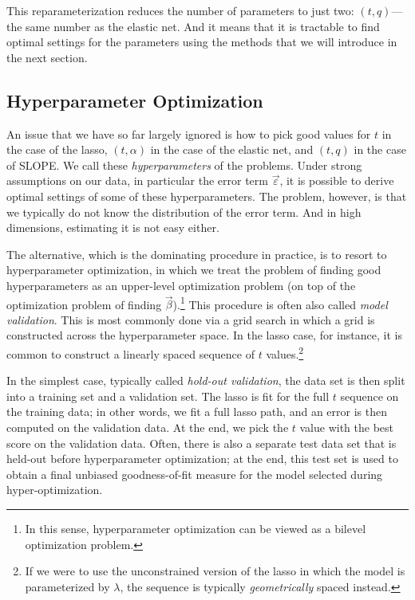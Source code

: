 This reparameterization reduces the number of parameters to just two: \((t,q)\)---the same number as the elastic net. And it means that it is tractable to find optimal settings for the parameters using the methods that we will introduce in the next section.

\subsection{Hyperparameter Optimization}

An issue that we have so far largely ignored is how to pick good values for \(t\) in the case of the lasso, \((t,\alpha)\) in the case of the elastic net, and \((t, q)\) in the case of SLOPE. We call these \emph{hyperparameters} of the problems. Under strong assumptions on our data, in particular the error term \(\vec{\varepsilon}\), it is possible to derive optimal settings of some of these hyperparameters. The problem, however, is that we typically do not know the distribution of the error term. And in high dimensions, estimating it is not easy either.

The alternative, which is the dominating procedure in practice, is to resort to hyperparameter optimization, in which we treat the problem of finding good hyperparameters as an upper-level optimization problem (on top of the optimization problem of finding \(\vec{\beta}\)).\footnote{In this sense, hyperparameter optimization can be viewed as a bilevel optimization problem.} This procedure is often also called \emph{model validation}. This is most commonly done via a grid search in which a grid is constructed across the hyperparameter space. In the lasso case, for instance, it is common to construct a linearly spaced sequence of \(t\) values.\footnote{If we were to use the unconstrained version of the lasso in which the model is parameterized by \(\lambda\), the sequence is typically \emph{geometrically} spaced instead.}

In the simplest case, typically called \emph{hold-out validation}, the data set is then split into a training set and a validation set. The lasso is fit for the full \(t\) sequence on the training data; in other words, we fit a full lasso path, and an error is then computed on the validation data. At the end, we pick the \(t\) value with the best score on the validation data. Often, there is also a separate test data set that is held-out before hyperparameter optimization; at the end, this test set is used to obtain a final unbiased goodness-of-fit measure for the model selected during hyper-optimization.

